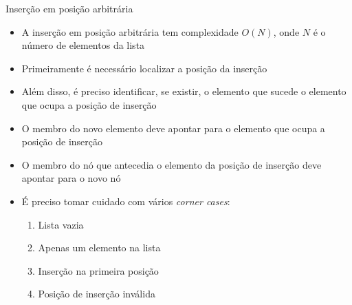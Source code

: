 \begin{frame}[fragile]{Inserção em posição arbitrária}

    \begin{itemize}
        \item A inserção em posição arbitrária tem complexidade $O(N)$, onde $N$ é o número
            de elementos da lista 

        \item Primeiramente é necessário localizar a posição da inserção

        \item Além disso, é preciso identificar, se existir, o elemento que sucede o elemento que
            ocupa a posição de inserção

        \item O membro  do novo elemento deve apontar para o elemento que
            ocupa a posição de inserção

        \item O membro  do nó que antecedia o elemento da posição de inserção
            deve apontar para o novo nó

        \item É preciso tomar cuidado com vários \textit{corner cases}:
            \begin{enumerate}
                \item Lista vazia
                \item Apenas um elemento na lista
                \item Inserção na primeira posição
                \item Posição de inserção inválida
            \end{enumerate}

    \end{itemize}

\end{frame}
